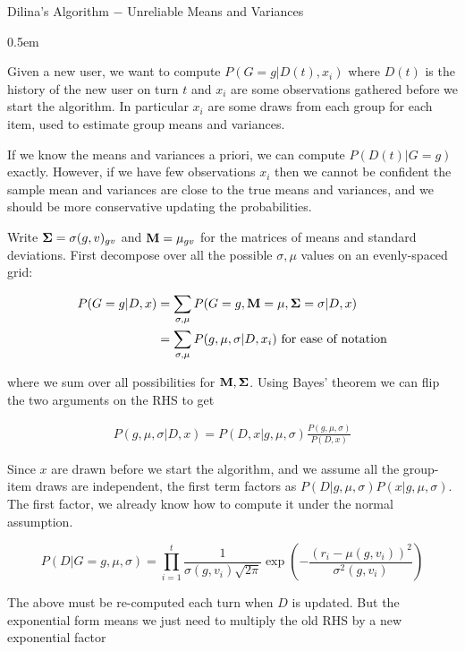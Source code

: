 \documentclass[12pt]{article}
\theoremstyle{definition}
\newcommand{\si}{\ensuremath{\sigma}}
\newcommand{\0}{\ensuremath{\varnothing}}
\newcommand{\MM}{{\bf M}}
\newcommand{\SSS}{{\bf \Sigma}}
\newcommand{\1}{{\bf 1}}
\begin{document}
\begin{center}
 
\Large Dilina's Algorithm $-$ Unreliable Means and Variances 

\end{center} 
\openup 0.5em 
  
  
  \noindent
  Given a new user, we want to compute $P(G = g | D(t), x_i)$ where $D(t)$ is the history of the new user on turn $t$ and $x_i$ are some observations gathered before we start the algorithm. In particular $x_i$ are some draws from each group for each item, used to estimate group means and variances. 
  
  If we know the means and   variances a priori, we can compute $P(D(t)| G=g)$ exactly. However, if we have few observations $x_i$ then we cannot be confident the sample mean and variances are close to the true means and variances, and we should be more conservative updating the probabilities. 
  
  Write ${\bf \Sigma}   =  \si(g,v)_{gv} $ and $ {\bf M } =    \mu_{gv}$ for the matrices of   means and standard deviations. First decompose over all the possible $\si,\mu$ values on an evenly-spaced grid:
  
  \begin{align}
   P(G=g| D, x) &= \sum_{\si, \mu}  P(G=g,    \MM =   \mu, \SSS =   \si| D, x)\\
   &= \sum_{\si, \mu}  P(g,       \mu,    \si| D, x_i) \text{ for ease of notation}
  \end{align}

  where we sum over all possibilities for $\MM,\SSS$. Using Bayes' theorem we can flip the two arguments on the RHS to get
  
  \begin{align}
   P(g,       \mu,    \si| D, x) =P(D, x|  g,       \mu,    \si  )\frac{P(g,        \mu,    \si ) }{P(  D, x) }
  \end{align}
  
  Since $x$ are drawn before we start the algorithm, and we assume all the group-item draws are independent,   the first term factors as   $P(D|  g,     \mu,  \si  )P(x|  g,       \mu,    \si  )$. The first factor, we already know how to compute it under the normal assumption.
  
  $$ P(D| G=g,       \mu,    \si  ) = \prod_{i=1}^t \frac{ 1}{ \si(g,v_i)\sqrt{2 \pi}} \exp \left(- \frac{(r_i -   \mu(g,v_i))^2}{  \si^2(g,v_i)}\right) $$
  
  The above must be re-computed each turn when $D$ is updated. But the exponential form means we just need to multiply the old RHS by a new exponential factor
  
\end{document}
